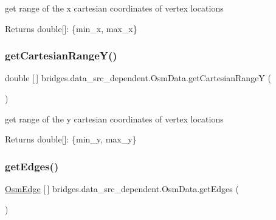 get range of the x cartesian coordinates of vertex locations \begin{DoxyReturn}{Returns}
double\mbox{[}\mbox{]}\+: \{min\+\_\+x, max\+\_\+x\} 
\end{DoxyReturn}
\mbox{\label{classbridges_1_1data__src__dependent_1_1_osm_data_a66e066ca35c27f82190e94e6c530d635}} 
\subsubsection{\texorpdfstring{get\+Cartesian\+Range\+Y()}{getCartesianRangeY()}}
{\footnotesize\ttfamily double \mbox{[}$\,$\mbox{]} bridges.\+data\+\_\+src\+\_\+dependent.\+Osm\+Data.\+get\+Cartesian\+RangeY (\begin{DoxyParamCaption}{ }\end{DoxyParamCaption})}

get range of the y cartesian coordinates of vertex locations \begin{DoxyReturn}{Returns}
double\mbox{[}\mbox{]}\+: \{min\+\_\+y, max\+\_\+y\} 
\end{DoxyReturn}
\mbox{\label{classbridges_1_1data__src__dependent_1_1_osm_data_a1ceb1a4b7acd75ca655ad0769f6b427d}} 
\subsubsection{\texorpdfstring{get\+Edges()}{getEdges()}}
{\footnotesize\ttfamily \hyperlink{classbridges_1_1data__src__dependent_1_1_osm_edge}{Osm\+Edge} \mbox{[}$\,$\mbox{]} bridges.\+data\+\_\+src\+\_\+dependent.\+Osm\+Data.\+get\+Edges (\begin{DoxyParamCaption}{ }\end{DoxyParamCaption})}

